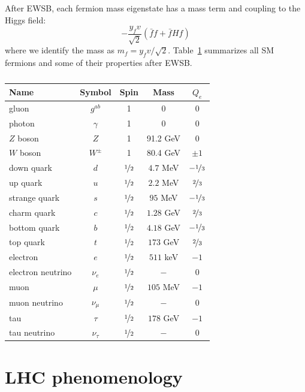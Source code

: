 After EWSB, each fermion mass eigenstate has a mass term and coupling to the Higgs field:
\begin{equation}
    -\frac{y_f v}{\sqrt{2}} \left( \bar ff + \bar fH f\right)
\end{equation}
where we identify the mass as $m_f = y_f v/\sqrt{2}$. 
Table~\ref{tab:theory:ewsb} summarizes all SM fermions and some of their properties after EWSB.

\begin{table}[]
\begin{center}
    \caption{}
    \label{tab:theory:ewsb}
    \begin{tabular}{l|c|c|c|c}
        Name & Symbol & Spin & Mass & $Q_e$  \\  \hline \hline
        gluon & $g^{ab}$ & 1 & 0 & 0 \\   
        photon & $\gamma $ & 1 & 0 & 0 \\   
        $Z$ boson & $Z$ & 1 & 91.2 GeV & 0 \\   
        $W$ boson & $W^{\pm}$ & 1 & 80.4 GeV & $\pm 1$ \\   \hline 
        down quark & $d$  & $\nicefrac{1}{2}$ & $4.7$ MeV  & $-\nicefrac{1}{3}$  \\   
        up quark & $u$ & $\nicefrac{1}{2}$ & $2.2$ MeV & $\nicefrac{2}{3}$    \\   
        strange quark & $s$  & $\nicefrac{1}{2}$ & $95$ MeV  & $-\nicefrac{1}{3}$  \\   
        charm quark & $c$  & $\nicefrac{1}{2}$ & $1.28$ GeV  & $\nicefrac{2}{3}$  \\   
        bottom quark & $b$  & $\nicefrac{1}{2}$ & $4.18$ GeV  & $-\nicefrac{1}{3}$  \\   
        top quark & $t$  & $\nicefrac{1}{2}$ & $173$ GeV  & $\nicefrac{2}{3}$  \\  \hline
        electron  & $e$  & $\nicefrac{1}{2}$ & $511$ keV  & $-1$  \\   
        electron neutrino  & $\nu_e$  & $\nicefrac{1}{2}$ & $-$  & $0$  \\   
        muon  & $\mu$  & $\nicefrac{1}{2}$ & $105$ MeV  & $-1$  \\   
        muon neutrino  & $\nu_\mu$  & $\nicefrac{1}{2}$ & $-$  & $0$  \\   
        tau  & $\tau$  & $\nicefrac{1}{2}$ & $178$ GeV  & $-1$  \\   
        tau neutrino  & $\nu_\tau$  & $\nicefrac{1}{2}$ & $-$  & $0$  \\ 
    \end{tabular}
\end{center}
\end{table}

\section{LHC phenomenology}



